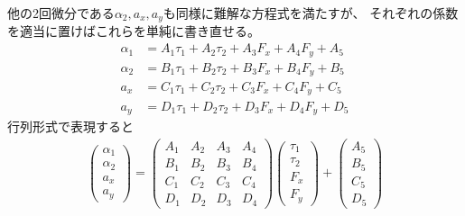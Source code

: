 \documentclass[a4paper,11pt]{jsarticle}
\begin{document}
\normalsize
他の2回微分である$\alpha_2, a_x, a_y$も同様に難解な方程式を満たすが、
それぞれの係数を適当に置けばこれらを単純に書き直せる。
\begin{align*}
  \alpha_1 &= A_1 \tau_1 + A_2 \tau_2 + A_3 F_x + A_4 F_y + A_5
  \\
  \alpha_2 &= B_1 \tau_1 + B_2 \tau_2 + B_3 F_x + B_4 F_y + B_5
  \\
  a_x &= C_1 \tau_1 + C_2 \tau_2 + C_3 F_x + C_4 F_y + C_5
  \\
  a_y &= D_1 \tau_1 + D_2 \tau_2 + D_3 F_x + D_4 F_y + D_5
\end{align*}
行列形式で表現すると
\begin{align*}
  \begin{pmatrix}
    \alpha_1
    \\
    \alpha_2
    \\
    a_x
    \\
    a_y
  \end{pmatrix}
  =
  \begin{pmatrix}
    A_1 & A_2 & A_3 & A_4
    \\
    B_1 & B_2 & B_3 & B_4
    \\
    C_1 & C_2 & C_3 & C_4
    \\
    D_1 & D_2 & D_3 & D_4
  \end{pmatrix}
  \begin{pmatrix}
    \tau_1
    \\
    \tau_2
    \\
    F_x
    \\
    F_y
  \end{pmatrix}
  + 
  \begin{pmatrix}
    A_5
    \\
    B_5
    \\
    C_5
    \\
    D_5
  \end{pmatrix}
\end{align*}
\end{document}
